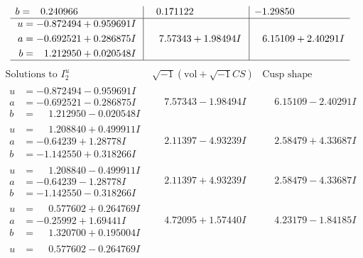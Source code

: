 \documentclass[1p]{elsarticle_modified}
\theoremstyle{definition}
\newcommand{\I}{\sqrt{-1}}
\begin{document}
$$\begin{array}{c|c|c}
\begin{aligned}
b &= \phantom{-}0.240966\phantom{ +0.000000I}\end{aligned}
 & \phantom{-}0.171122\phantom{ +0.000000I} & -1.29850\phantom{ +0.000000I} \\ \hline\begin{aligned}
u &= -0.872494 + 0.959691 I \\
a &= -0.692521 + 0.286875 I \\
b &= \phantom{-}1.212950 + 0.020548 I\end{aligned}
 & \phantom{-}7.57343 + 1.98494 I & \phantom{-}6.15109 + 2.40291 I\\
 \hline 
 \end{array}$$\newpage$$\begin{array}{c|c|c}  
\text{Solutions to }I^u_{2}& \I (\text{vol} + \sqrt{-1}CS) & \text{Cusp shape}\\
 \hline 
\begin{aligned}
u &= -0.872494 - 0.959691 I \\
a &= -0.692521 - 0.286875 I \\
b &= \phantom{-}1.212950 - 0.020548 I\end{aligned}
 & \phantom{-}7.57343 - 1.98494 I & \phantom{-}6.15109 - 2.40291 I \\ \hline\begin{aligned}
u &= \phantom{-}1.208840 + 0.499911 I \\
a &= -0.64239 + 1.28778 I \\
b &= -1.142550 + 0.318266 I\end{aligned}
 & \phantom{-}2.11397 - 4.93239 I & \phantom{-}2.58479 + 4.33687 I \\ \hline\begin{aligned}
u &= \phantom{-}1.208840 - 0.499911 I \\
a &= -0.64239 - 1.28778 I \\
b &= -1.142550 - 0.318266 I\end{aligned}
 & \phantom{-}2.11397 + 4.93239 I & \phantom{-}2.58479 - 4.33687 I \\ \hline\begin{aligned}
u &= \phantom{-}0.577602 + 0.264769 I \\
a &= -0.25992 + 1.69441 I \\
b &= \phantom{-}1.320700 + 0.195004 I\end{aligned}
 & \phantom{-}4.72095 + 1.57440 I & \phantom{-}4.23179 - 1.84185 I \\ \hline\begin{aligned}
u &= \phantom{-}0.577602 - 0.264769 I \\

\end{aligned}
\end{array}$$
\end{document}

